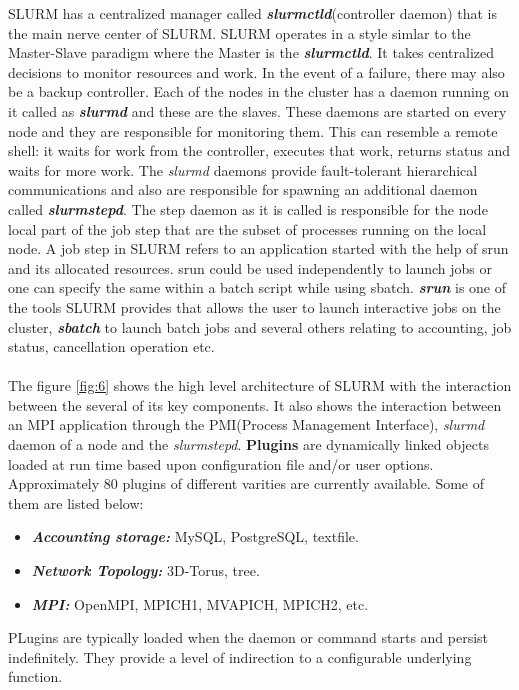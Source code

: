 SLURM has a centralized manager called \textbf{\textit{slurmctld}}(controller daemon) that is the main nerve center of SLURM. SLURM operates in a style simlar to the Master-Slave paradigm where the Master is the \textbf{\textit{slurmctld}}. It takes centralized decisions to monitor resources and work. In the event of a failure, there may also be a backup controller. Each of the nodes in the cluster has a daemon running on it called as \textbf{\textit{slurmd}} and these are the slaves. These daemons are started on every node and they are responsible for monitoring them. This can resemble a remote shell: it waits for work from the controller, executes that work, returns status and waits for more work. The \textit{slurmd} daemons provide fault-tolerant hierarchical communications and also are responsible for spawning an additional daemon called \textbf{\textit{slurmstepd}}. The step daemon as it is called is responsible for the node local part of the job step that are the subset of processes running on the local node. A job step in SLURM refers to an application started with the help of srun and its allocated resources. srun could be used independently to launch jobs or one can specify the same within a batch script while using sbatch. \textbf{\textit{srun}} is one of the tools SLURM provides that allows the user to launch interactive jobs on the cluster, \textbf{\textit{sbatch}} to launch batch jobs and several others relating to accounting, job status, cancellation operation etc.\\ \\
The figure \ref{fig:6} shows the high level architecture of SLURM with the interaction between the several of its key components. It also shows the interaction between an MPI application through the PMI(Process Management Interface), \textit{slurmd} daemon of a node and the \textit{slurmstepd}.
\textbf{Plugins} are dynamically linked objects loaded at run time based upon configuration file and/or user options. Approximately $80$ plugins of different varities are currently available. Some of them are listed below:
\begin{itemize}
\item \textbf{\textit{Accounting storage:}} MySQL, PostgreSQL, textfile.
\item \textbf{\textit{Network Topology:}} 3D-Torus, tree.
\item \textbf{\textit{MPI:}} OpenMPI, MPICH1, MVAPICH, MPICH2, etc.
\end{itemize}
PLugins are typically loaded when the daemon or command starts and persist indefinitely. They provide a level of indirection to a configurable underlying function.
